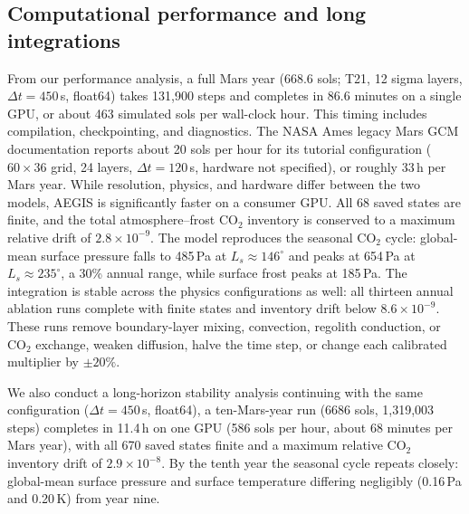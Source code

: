 \documentclass{article} %
\newcommand{\co}{CO$_2$}
\begin{document}



\subsection{Computational performance and long integrations}
\label{sec:performance}

From our performance analysis, a full Mars year (668.6 sols; T21, 12 sigma layers, $\Delta t=450$\,s, float64) takes 131{,}900 steps and completes in 86.6 minutes on a single GPU, or about 463 simulated sols per wall-clock hour. This timing includes compilation, checkpointing, and diagnostics. The NASA Ames legacy Mars GCM documentation reports about 20 sols per hour for its tutorial configuration ($60\times36$ grid, 24 layers, $\Delta t=120$\,s, hardware not specified), or roughly 33\,h per Mars year. While resolution, physics, and hardware differ between the two models, AEGIS is significantly faster on a consumer GPU. All 68 saved states are finite, and the total atmosphere--frost \co{} inventory is conserved to a maximum relative drift of $2.8\times10^{-9}$. The model reproduces the seasonal \co{} cycle: global-mean surface pressure falls to 485\,Pa at $L_s\approx146^\circ$ and peaks at 654\,Pa at $L_s\approx235^\circ$, a 30\% annual range, while surface frost peaks at 185\,Pa. The integration is stable across the physics configurations as well: all thirteen annual ablation runs complete with finite states and inventory drift below $8.6\times10^{-9}$. These runs remove boundary-layer mixing, convection, regolith conduction, or \co{} exchange, weaken diffusion, halve the time step, or change each calibrated multiplier by $\pm20\%$.

We also conduct a long-horizon stability analysis continuing with the same configuration ($\Delta t=450$\,s, float64), a ten-Mars-year run (6686 sols, 1{,}319{,}003 steps) completes in 11.4\,h on one GPU (586 sols per hour, about 68 minutes per Mars year), with all 670 saved states finite and a maximum relative \co{} inventory drift of $2.9\times10^{-8}$. By the tenth year the seasonal cycle repeats closely: global-mean surface pressure and surface temperature differing negligibly (0.16\,Pa and 0.20\,K) from year nine.
\end{document}
